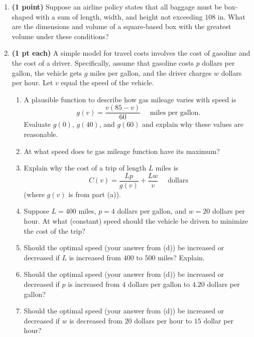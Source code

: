\documentclass[12pt,letterpaper]{article}
\begin{document}
\begin{enumerate}
\item {\bf (1 point)} Suppose an airline policy states that all baggage must be box-shaped with a sum of length, width, and height not exceeding $108$ in.  What are the dimensions and volume of a square-based box with the greatest volume under these conditions?  

\item {\bf (1 pt each)} A simple model for travel costs involves the cost of gasoline and the cost of a driver.  Specifically, assume that gasoline costs $p$ dollars per gallon, the vehicle gets $g$ miles per gallon, and the driver charges $w$ dollars per hour.  Let $v$ equal the speed of the vehicle.
	\begin{enumerate}
	\item A plausible function to describe how gas mileage varies with speed is 
	\[g(v)=\frac{v(85-v)}{60}\quad\text{ miles per gallon.}\]
	Evaluate $g(0)$, $g(40)$, and $g(60)$ and explain why these values are reasonable.
	\item At what speed does te gas mileage function have its maximum?
	\item Explain why the cost of a trip of length $L$ miles is 
	\[C(v)=\frac{Lp}{g(v)}+\frac{Lw}{v}\quad\text{ dollars}\]
	(where $g(v)$ is from part (a)).
	\item Suppose $L=400$ miles, $p=4$ dollars per gallon, and $w=20$ dollars per hour.  At what (constant) speed should the vehicle be driven to minimize the cost of the trip?
	\item Should the optimal speed (your answer from (d)) be increased or decreased if $L$ is increased from $400$ to $500$ miles?  Explain.
	\item Should the optimal speed (your answer from (d)) be increased or decreased if $p$ is increased from $4$ dollars per gallon to $4.20$ dollars per gallon?
	\item Should the optimal speed (your answer from (d)) be increased or decreased if $w$ is decreased from $20$ dollars per hour to $15$ dollar per hour?
	\end{enumerate}


\end{enumerate}
\end{document}
